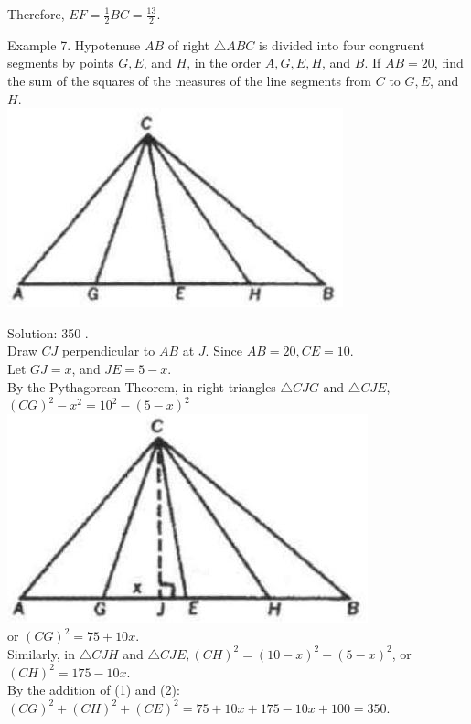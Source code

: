 \documentclass[10pt]{article}
\begin{document}
Therefore, \(E F=\frac{1}{2} B C=\frac{13}{2}\).

Example 7. Hypotenuse \(A B\) of right \(\triangle A B C\) is divided into four congruent segments by points \(G, E\), and \(H\), in the order \(A, G, E, H\), and \(B\). If \(A B=20\), find the sum of the squares of the measures of the line segments from \(C\) to \(G, E\), and \(H\).\\
\includegraphics[max width=\textwidth, center]{2025_04_17_97bc1f7e44d93c271a88g-079(2)}

Solution: 350 .\\
Draw \(C J\) perpendicular to \(A B\) at \(J\). Since \(A B=20, C E=10\).\\
Let \(G J=x\), and \(J E=5-x\).\\
By the Pythagorean Theorem, in right triangles \(\triangle C J G\) and \(\triangle C J E\),\\
\((C G)^{2}-x^{2}=10^{2}-(5-x)^{2}\)\\
\includegraphics[max width=\textwidth, center]{2025_04_17_97bc1f7e44d93c271a88g-079(1)}\\
or \((C G)^{2}=75+10 x\).\\
Similarly, in \(\triangle C J H\) and \(\triangle C J E,(C H)^{2}=(10-x)^{2}-(5-x)^{2}\), or \((C H)^{2}=175-10 x\).\\
By the addition of (1) and (2):\\
\((C G)^{2}+(C H)^{2}+(C E)^{2}=75+10 x+175-10 x+100=350\).
\end{document}
